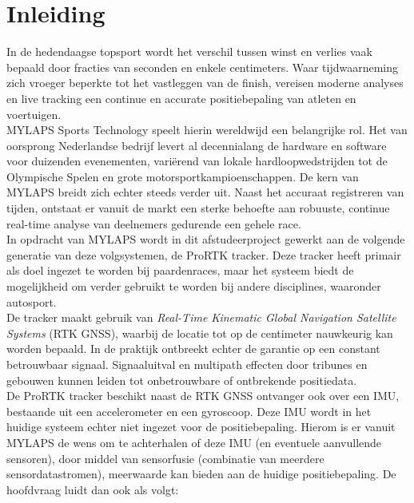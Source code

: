 
\section{Inleiding}
\label{sec:inleiding}

In de hedendaagse topsport wordt het verschil tussen winst en verlies vaak 
bepaald door fracties van seconden en enkele centimeters. Waar tijdwaarneming 
zich vroeger beperkte tot het vastleggen van de finish, vereisen moderne 
analyses en live tracking een continue en accurate positiebepaling van atleten 
en voertuigen. \\

MYLAPS Sports Technology speelt hierin wereldwijd een belangrijke rol. Het van 
oorsprong Nederlandse bedrijf levert al decennialang de hardware en software 
voor duizenden evenementen, variërend van lokale hardloopwedstrijden tot de 
Olympische Spelen en grote motorsportkampioenschappen. De kern van MYLAPS 
breidt zich echter steeds verder uit. Naast het accuraat registreren van 
tijden, ontstaat er vanuit de markt een sterke behoefte aan robuuste, continue 
real-time analyse van deelnemers gedurende een gehele race. \\

In opdracht van MYLAPS wordt in dit afstudeerproject gewerkt aan de volgende 
generatie van deze volgsystemen, de ProRTK tracker. Deze tracker heeft primair als doel ingezet te worden bij paardenraces, maar het systeem biedt de mogelijkheid om verder gebruikt te worden bij andere disciplines, waaronder autosport. \\

De tracker maakt gebruik van \textit{Real-Time Kinematic Global Navigation Satellite 
Systems} (RTK GNSS), waarbij de locatie tot op de centimeter nauwkeurig kan 
worden bepaald. In de praktijk ontbreekt echter de garantie op een constant 
betrouwbaar signaal. Signaaluitval en multipath effecten door tribunes en gebouwen kunnen leiden tot onbetrouwbare of ontbrekende positiedata. \\

De ProRTK tracker beschikt naast de RTK GNSS ontvanger ook over een IMU, bestaande uit een accelerometer en een gyroscoop. Deze IMU 
wordt in het huidige systeem echter niet ingezet voor de positiebepaling. Hierom is er vanuit MYLAPS de wens om te achterhalen of deze IMU (en eventuele aanvullende sensoren), door middel van sensorfusie (combinatie van meerdere sensordatastromen), meerwaarde kan bieden aan de huidige positiebepaling. De hoofdvraag luidt dan ook als volgt:

